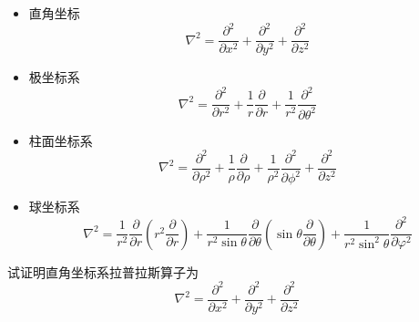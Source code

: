 \begin{itemize}
	\item 直角坐标 \begin{equation}  \nabla ^{2}  = \frac{\partial ^2}{\partial x^2} +\frac{\partial^2 }{\partial y^2}+\frac{\partial^2 }{\partial z^2}\end{equation}
	\item 极坐标系  \begin{equation}\nabla ^{2} =\frac{\partial ^2 }{\partial r^2 } +\frac{1}{r } \frac{\partial }{\partial r } +
	\frac{1}{r^2 } \frac{\partial ^2 }{\partial \theta ^2}  \end{equation}
	\item 柱面坐标系\begin{equation}
	\nabla^2=\frac{\partial^2}{\partial \rho^2}+\frac{1}{\rho} \frac{\partial}{\partial \rho}+\frac{1}{\rho^2} \frac{\partial^2}{\partial \phi^2}+\frac{\partial^2}{\partial z^2}
\end{equation}
	\item 球坐标系
	\begin{equation} \nabla ^{2} =\frac{1}{r^2} \frac{\partial }{\partial r} (r^2\frac{\partial }{\partial r} )+
	\frac{1}{r^2 \sin \theta  } \frac{\partial }{\partial \theta } (\sin \theta \frac{\partial }{\partial \theta } )
	+\frac{1}{r^2 \sin^2 \theta  } \frac{\partial^2}{\partial\varphi ^2}\end{equation}
\end{itemize}
\begin{example}
	试证明直角坐标系拉普拉斯算子为
	$$\displaystyle  \nabla ^{2}  = \frac{\partial ^2}{\partial x^2} +\frac{\partial^2 }{\partial y^2}+\frac{\partial^2 }{\partial z^2}$$
\end{example}

